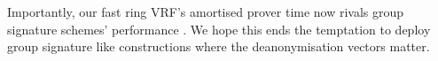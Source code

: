 Importantly, our fast ring VRF's amortised prover time now rivals
group signature schemes' performance \cite{group_sig_survey}.
We hope this ends the temptation to deploy group signature like
constructions where the deanonymisation vectors matter. 

\begin{comment}

\def\longeq{=\mathrel{\mkern-10mu}=}%
We describe a much faster choice \pifast for \piring with
opaque inputs $x_1 \longeq \sk$ and transparent inputs $y_1 \longeq \comring$
 so that taking
 $\genG \longeq \chi_1$, $\genB \longeq \genB_\gamma$, and $\openpk \longeq b$
in \PedVRF yields an incredibly fast amortised ring VRF prover.
Also \PedVRF itself proves knowledge of $X' =  \sk\, \chi_1 + b \genB_\gamma $,
 as required by $\SpecialG.\Verify$.

A priori, we do not know $\chi_1$ during the trusted setup for $\pifast$,
which prevents computing $\pk = \sk\, \chi_1$ inside $\pifast$.
Instead, we propose $\ring$ contain commitments to $\sk$ over
some Jubjub curve $\ecJ$, while $\sk \in \F_p$ remains a scale for $\grJ$.

We know the large subgroup $\grJ$ of $\ecJ$ typically has smaller prime
order $p_\grJ$ than $\grE$, itself due to $\ecJ$ being an Edwards curve.
%
We thus choose $\sk_0,\sk_1 < p_\grJ$ with at least $\lambda$ bits
so that
 $\PedVRF.\sk = \sk_0 + \sk_1 \, 2^{\lambda} \mod p_\grE$
becomes our secret key.
\footnote{If $\lambda \approx 128$ then $p, p_\grJ > 2^{2\lambda-3}$.}
Our $\rVRF.\KeyGen$ \eprint{returns}{shall now return}
a secret key of the form $\rVRF.\sk = (\sk_0,\sk_1,d)$
 with $d \leftsample \F_{p_\grJ}$ and
a public key of the form
 $\rVRF.\pk = \sk_0\, \genJ_0 + \sk_1\, \genJ_1 + d \genJ_2$,
for some independent $\genJ_0,\genJ_1,\genJ_2 \in \grJ$. %
\footnote{Interestingly we avoid range proofs for $\sk_1$ and $\sk_2$ by this independence.}
We thus have a fairly efficient instantiation for $\Lring^\inner$ give by

$$ \Lfast^\inner = \Setst{ \sk_0 + 2^{128} \sk_1, \comring }{
 \eprint{ \exists d,\openring \textrm{\ s.t.\ } }{}
 \genfrac{}{}{0pt}{}{ \eprint{\rVRF.}{}\OpenRing(\comring,\openring) }{ \,\, = \sk_0 \genJ_0 + \sk_1 \genJ_1 + d \genJ_2 }
} \mathperiod $$


\end{comment}
